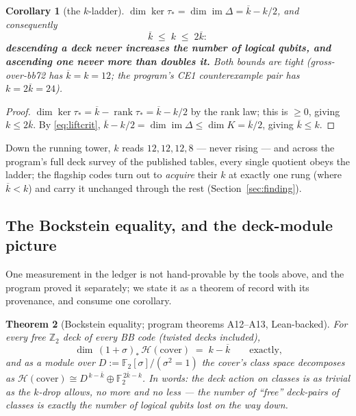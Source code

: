 \documentclass[11pt]{article}
\theoremstyle{plain}
\newtheorem{theorem}{Theorem}[section]
\newtheorem{corollary}[theorem]{Corollary}
\theoremstyle{definition}
\theoremstyle{remark}
\newcommand{\F}{\mathbb{F}}
\newcommand{\Z}{\mathbb{Z}}
\newcommand{\imD}{\operatorname{im}\Delta}
\newcommand{\clH}{\mathcal{H}}
\newcommand{\cov}{\mathrm{cover}}
\newcommand{\ov}[1]{\overline{#1}}
\begin{document}
\begin{corollary}[the $k$-ladder]\label{cor:kladder}
$\dim \ker \tau_* = \dim \imD = \ov k - k/2$, and consequently
\[
\ov k \;\leq\; k \;\leq\; 2\ov k :
\]
\textbf{descending a deck never increases the number of logical qubits,
and ascending one never more than doubles it.} Both bounds are tight
(gross-over-bb72 has $\ov k = k = 12$; the program's CE1 counterexample
pair has $k = 2\ov k = 24$).
\end{corollary}

\begin{proof}
$\dim \ker \tau_* = \ov k - \operatorname{rank}\tau_* = \ov k - k/2$ by
the rank law; this is $\geq 0$, giving $k \leq 2\ov k$. By
\eqref{eq:liftcrit}, $\ov k - k/2 = \dim \imD \leq \dim K = \ov k / 2$,
giving $\ov k \leq k$.
\end{proof}

Down the running tower, $k$ reads $12, 12, 12, 8$ --- never rising ---
and across the program's full deck survey of the published tables, every
single quotient obeys the ladder; the flagship codes turn out to
\emph{acquire} their $k$ at exactly one rung (where $\ov k < k$) and
carry it unchanged through the rest (Section~\ref{sec:finding}).

\subsection{The Bockstein equality, and the deck-module picture}

One measurement in the ledger is not hand-provable by the tools above,
and the program proved it separately; we state it as a theorem of record
with its provenance, and consume one corollary.

\begin{theorem}[Bockstein equality; program theorems A12--A13,
Lean-backed]\label{thm:bockstein}
For every free $\Z_2$ deck of every BB code (twisted decks included),
\[
\dim\, (1+\sigma)_*\,\clH(\cov) \;=\; k - \ov k
\qquad\text{exactly,}
\]
and as a module over $D := \F_2[\sigma]/(\sigma^2{=}1)$ the cover's class
space decomposes as $\clH(\cov) \cong D^{\,k - \ov k} \oplus
\F_2^{\,2\ov k - k}$. In words: the deck action on classes is as trivial
as the $k$-drop allows, no more and no less --- the number of ``free''
deck-pairs of classes is exactly the number of logical qubits lost on the
way down.
\end{theorem}
\end{document}
